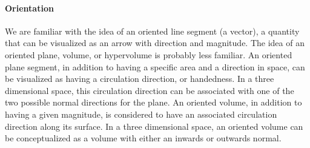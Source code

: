 


\paragraph{Orientation}
We are familiar with the idea of an oriented line segment (a vector), a quantity that can be visualized as an arrow with direction and magnitude.
The idea of an oriented plane, volume, or hypervolume is probably less familiar.
An oriented plane segment, in addition to having a specific area and a direction in space, can be visualized as having a
circulation direction, or handedness.
In a three dimensional space, this circulation direction can be associated with one of the two possible normal directions for the plane.
An oriented volume, in addition to having a given magnitude, is considered to have an associated circulation direction along its surface.
In a three dimensional space, an oriented volume can be conceptualized as a volume with either an inwards or outwards normal.


